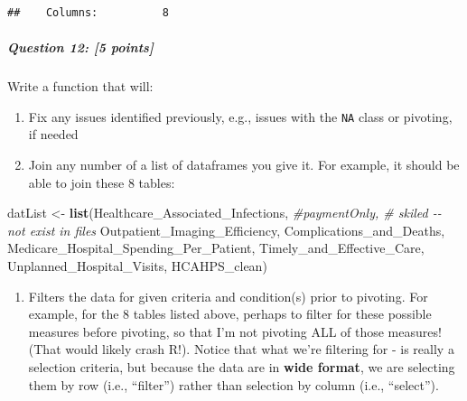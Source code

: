 \documentclass[
]{article}
\newenvironment{Shaded}{\begin{snugshade}}{\end{snugshade}}
\newcommand{\CommentTok}[1]{\textcolor[rgb]{0.56,0.35,0.01}{\textit{#1}}}
\newcommand{\FunctionTok}[1]{\textcolor[rgb]{0.13,0.29,0.53}{\textbf{#1}}}
\newcommand{\NormalTok}[1]{#1}
\newcommand{\OtherTok}[1]{\textcolor[rgb]{0.56,0.35,0.01}{#1}}
\providecommand{\tightlist}{%
  \setlength{\itemsep}{0pt}\setlength{\parskip}{0pt}}
\begin{document}
\begin{verbatim}
##    Columns:          8
\end{verbatim}

\subparagraph{\texorpdfstring{\textbf{Question 12}: {[}5
points{]}}{Question 12: {[}5 points{]}}}\label{question-12-5-points}

Write a function that will:

\begin{enumerate}
\def\labelenumi{\arabic{enumi}.}
\item
  Fix any issues identified previously, e.g., issues with the
  \texttt{NA} class or pivoting, if needed
\item
  Join any number of a list of dataframes you give it. For example, it
  should be able to join these 8 tables:
\end{enumerate}

\begin{Shaded}
\begin{Highlighting}[]
\NormalTok{datList }\OtherTok{\textless{}{-}} \FunctionTok{list}\NormalTok{(Healthcare\_Associated\_Infections,}
                \CommentTok{\#paymentOnly,  \# skiled {-}{-} not exist in files}
\NormalTok{                Outpatient\_Imaging\_Efficiency,}
\NormalTok{                Complications\_and\_Deaths,}
\NormalTok{                Medicare\_Hospital\_Spending\_Per\_Patient, }
\NormalTok{                Timely\_and\_Effective\_Care, }
\NormalTok{                Unplanned\_Hospital\_Visits,}
\NormalTok{                HCAHPS\_clean)}
\end{Highlighting}
\end{Shaded}

\begin{enumerate}
\def\labelenumi{\arabic{enumi}.}
\setcounter{enumi}{2}
\tightlist
\item
  Filters the data for given criteria and condition(s) prior to
  pivoting. For example, for the 8 tables listed above, perhaps to
  filter for these possible measures before pivoting, so that I'm not
  pivoting ALL of those measures! (That would likely crash R!). Notice
  that what we're filtering for - is really a selection criteria, but
  because the data are in \textbf{wide format}, we are selecting them by
  row (i.e., ``filter'') rather than selection by column (i.e.,
  ``select'').
\end{enumerate}
\end{document}
